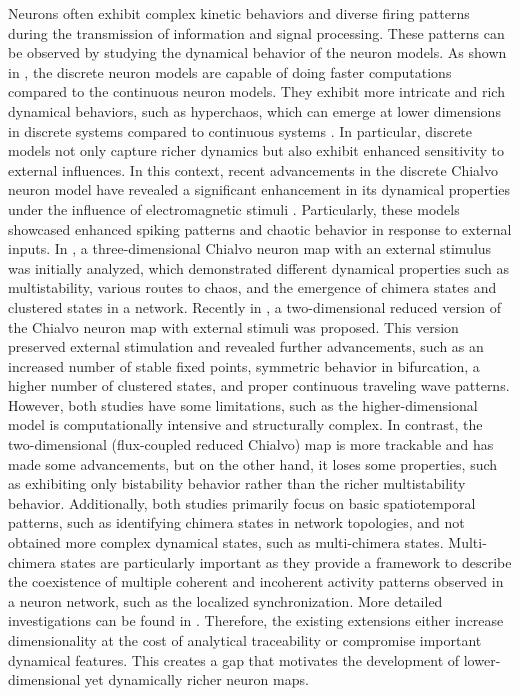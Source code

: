 \documentclass{article}
\begin{document}
Neurons often exhibit complex kinetic behaviors and diverse firing patterns during the transmission of information and signal processing. These patterns can be observed by studying the dynamical behavior of the neuron models. As shown in \cite{xiu2020new,yu2021dynamics}, the discrete neuron models are capable of doing faster computations compared to the continuous neuron models. They exhibit more intricate and rich dynamical behaviors, such as hyperchaos, which can emerge at lower dimensions in discrete systems compared to continuous systems \cite{liu2022memcapacitor}. In particular, discrete models not only capture richer dynamics but also exhibit enhanced sensitivity to external influences. In this context, recent advancements in the discrete Chialvo neuron model have revealed a significant enhancement in its dynamical properties under the influence of electromagnetic stimuli \cite{muni2022dynamical,kumar2026study}. Particularly, these models showcased enhanced spiking patterns and chaotic behavior in response to external inputs. In \cite{muni2022dynamical}, a three-dimensional Chialvo neuron map with an external stimulus was initially analyzed, which demonstrated different dynamical properties such as multistability, various routes to chaos, and the emergence of chimera states and clustered states in a network. Recently in \cite{kumar2026study}, a two-dimensional reduced version of the Chialvo neuron map with external stimuli was proposed. This version preserved external stimulation and revealed further advancements, such as an increased number of stable fixed points, symmetric behavior in bifurcation, a higher number of clustered states, and proper continuous traveling wave patterns. However, both studies have some limitations, such as the higher-dimensional model is computationally intensive and structurally complex. In contrast, the two-dimensional (flux-coupled reduced Chialvo) map is more trackable and has made some advancements, but on the other hand, it loses some properties, such as exhibiting only bistability behavior rather than the richer multistability behavior. Additionally, both studies primarily focus on basic spatiotemporal patterns, such as identifying chimera states in network topologies, and not obtained more complex dynamical states, such as multi-chimera states. Multi-chimera states are particularly important as they provide a framework to describe the coexistence of multiple coherent and incoherent activity patterns observed in a neuron network, such as the localized synchronization. More detailed investigations can be found in 
\cite{wang2024multi}. Therefore, the existing extensions either increase dimensionality at the cost of analytical traceability or compromise important dynamical features. This creates a gap that motivates the development of lower-dimensional yet dynamically richer neuron maps.
\end{document}
